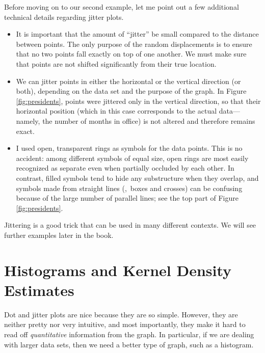 Before moving on to our second example, let me point out a few
additional technical details regarding jitter plots.

\begin{itemize}
\item It is important that the amount of ``jitter'' be small compared
  to the distance between points. The only purpose of the random
  displacements is to ensure that no two points fall exactly on top of
  one another. We must make sure that points are not shifted
  significantly from their true location.

\item We can jitter points in either the horizontal or the vertical
  direction (or both), depending on the data set and the purpose of
  the graph. In Figure \ref{fig:presidents}, points were jittered only
  in the vertical direction, so that their horizontal position (which
  in this case corresponds to the actual data---namely, the number of
  months in office) is not altered and therefore remains exact.

\item I used open, transparent rings as symbols for the data points.
  This is no accident: among different symbols of equal size, open
  rings are most easily recognized as separate even when partially
  occluded by each other. In contrast, filled symbols tend to hide
  any substructure when they overlap, and symbols made from straight
  lines (\eg,\ boxes and crosses) can be confusing because of the large
  number of parallel lines; see the top part of Figure
  \ref{fig:presidents}.
\end{itemize}

Jittering is a good trick that can be used in many different contexts.
We will see further examples later in the book.


\section{Histograms and Kernel Density Estimates}


Dot and jitter plots are nice because they are so simple.  However,
they are neither pretty nor very intuitive, and most importantly, they
make it hard to read off \emph{quantitative} information from the
graph. In particular, if we are dealing with larger data sets, then we
need a better type of graph, such as a histogram.


